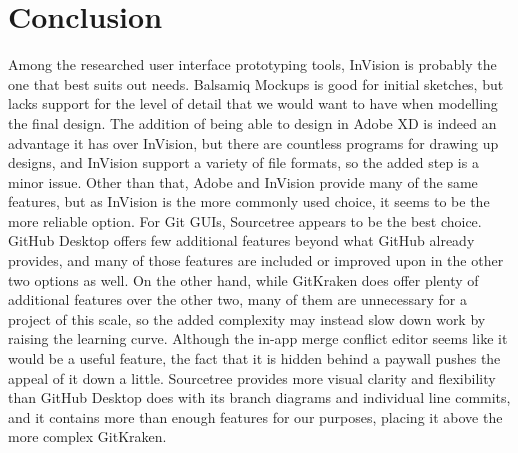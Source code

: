 \documentclass[10pt, letterpaper,draftclsnofoot,onecolumn, compsoc]{IEEEtran}
\begin{document}
\section{Conclusion}
Among the researched user interface prototyping tools, InVision is probably the one that best suits out needs. Balsamiq Mockups is good for initial sketches, but lacks support for the level of detail that we would want to have when modelling the final design. The addition of being able to design in Adobe XD is indeed an advantage it has over InVision, but there are countless programs for drawing up designs, and InVision support a variety of file formats, so the added step is a minor issue. Other than that, Adobe and InVision provide many of the same features, but as InVision is the more commonly used choice, it seems to be the more reliable option. For Git GUIs, Sourcetree appears to be the best choice. GitHub Desktop offers few additional features beyond what GitHub already provides, and many of those features are included or improved upon in the other two options as well. On the other hand, while GitKraken does offer plenty of additional features over the other two, many of them are unnecessary for a project of this scale, so the added complexity may instead slow down work by raising the learning curve. Although the in-app merge conflict editor seems like it would be a useful feature, the fact that it is hidden behind a paywall pushes the appeal of it down a little. Sourcetree provides more visual clarity and flexibility than GitHub Desktop does with its branch diagrams and individual line commits, and it contains more than enough features for our purposes, placing it above the more complex GitKraken.
\end{document}
